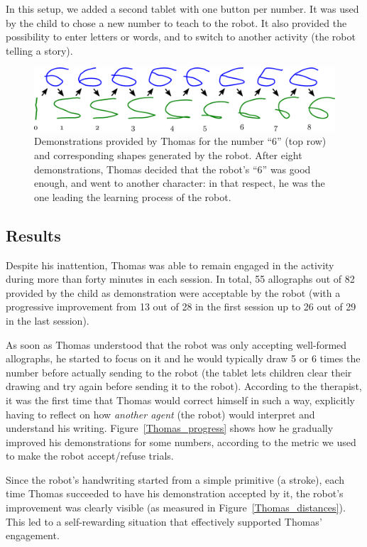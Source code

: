 \documentclass{sig-alternate}
\begin{document}
In this setup, we added a second tablet with one button per number. It was used
by the child to chose a new number to teach to the robot. It also provided the
possibility to enter letters or words, and to switch to another activity (the
robot telling a story).

\begin{figure}
    \centering
    \includegraphics[width=0.9\linewidth]{learning_6_demos}
    \caption{\small Demonstrations provided by Thomas for the number ``6'' (top row) and
        corresponding shapes generated by the robot. After eight demonstrations,
        Thomas decided that the robot's ``6'' was good enough, and went to
    another character: in that respect, he was the one leading the learning
process of the robot.}
    \label{learning_6_demos}
\end{figure}

\subsection{Results}
Despite his inattention, Thomas was able to remain engaged in the activity during more than
forty minutes in each session. In total, 55 allographs out of 82 
provided by the child as demonstration were acceptable by the robot (with a
progressive improvement from 13 out of 28 in the first session up to 26 out
of 29 in the last session).

As soon as Thomas understood that the robot was only accepting well-formed
allographs, he started to focus on it and he would typically draw 5 or 6 times
the number before actually sending to the robot (the tablet lets children
clear their drawing and try again before sending it to the robot). According to
the therapist, it was the first time that Thomas would correct himself in such a
way, explicitly having to reflect on how \emph{another agent} (the robot) would
interpret and understand his writing. Figure~\ref{Thomas_progress} shows how
he gradually improved his demonstrations for some numbers, according to the
metric we used to make the robot accept/refuse trials.

Since the robot's handwriting started from a simple primitive (a stroke), each
time Thomas succeeded to have his demonstration accepted by it, the robot's
improvement was clearly visible (as measured in Figure~\ref{Thomas_distances}).
This led to a self-rewarding situation that effectively supported Thomas'
engagement.
\end{document}
